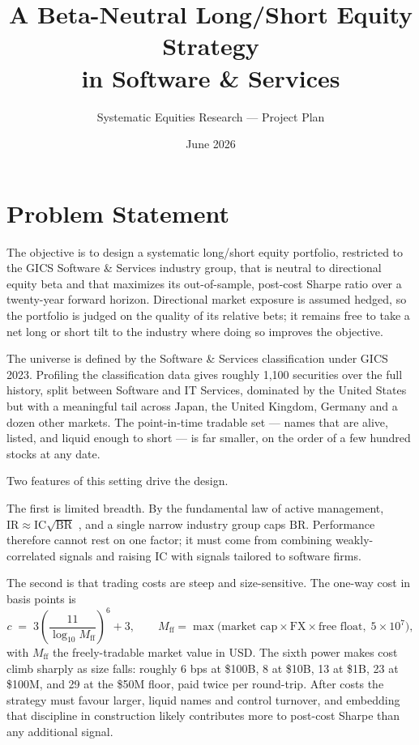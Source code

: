 \documentclass[11pt]{article}
\title{\bfseries A Beta-Neutral Long/Short Equity Strategy \\ in Software \& Services}
\author{Systematic Equities Research --- Project Plan}
\date{June 2026}
\newcommand{\Mff}{M_{\mathrm{ff}}}
\newcommand{\IC}{\mathrm{IC}}
\begin{document}
\maketitle

\section{Problem Statement}

The objective is to design a systematic long/short equity portfolio, restricted to the
GICS Software \& Services industry group, that is neutral to directional equity beta and
that maximizes its out-of-sample, post-cost Sharpe ratio over a twenty-year forward
horizon. Directional market exposure is assumed hedged, so the portfolio is judged on the
quality of its relative bets; it remains free to take a net long or short tilt to the
industry where doing so improves the objective.

The universe is defined by the Software \& Services classification under GICS 2023.
Profiling the classification data gives roughly 1,100 securities over the full history,
split between Software and IT Services, dominated by the United States but with a
meaningful tail across Japan, the United Kingdom, Germany and a dozen other markets. The
point-in-time tradable set --- names that are alive, listed, and liquid enough to short
--- is far smaller, on the order of a few hundred stocks at any date.

Two features of this setting drive the design.

The first is limited breadth. By the fundamental law of active management,
$\mathrm{IR}\approx\IC\sqrt{\mathrm{BR}}$ \citep{grinold1989}, and a single narrow
industry group caps $\mathrm{BR}$. Performance therefore cannot rest on one factor; it
must come from combining weakly-correlated signals and raising $\IC$ with signals
tailored to software firms.

The second is that trading costs are steep and size-sensitive. The one-way cost in basis
points is
\begin{equation}
  c \;=\; 3\left(\frac{11}{\log_{10}\Mff}\right)^{6} + 3,
  \qquad
  \Mff = \max\!\big(\text{market cap} \times \text{FX} \times \text{free float},\;
  5\times 10^{7}\big),
\end{equation}
with $\Mff$ the freely-tradable market value in USD. The sixth power makes cost climb
sharply as size falls: roughly 6 bps at \$100B, 8 at \$10B, 13 at \$1B, 23 at \$100M, and
29 at the \$50M floor, paid twice per round-trip. After costs the strategy must favour
larger, liquid names and control turnover, and embedding that discipline in construction
likely contributes more to post-cost Sharpe than any additional signal.
\end{document}
